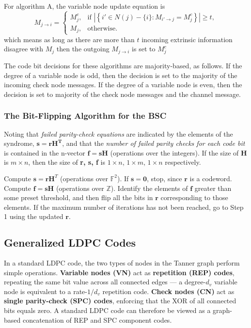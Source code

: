 \documentclass[11pt]{article}
\begin{document}
For algorithm A, the variable node update equation is
\[
M_{j \to i}
=
\begin{cases}
M_j^c, & \text{if } \left|\left\{ i' \in N(j)-\{i\} : M_{i' \to j} = M_j^c \right\}\right| \geq t,\\
M_j, & \text{otherwise.}
\end{cases}
\]
which means as long as there are more than $t$ incoming extrinsic information disagree with $M_j$ then the outgoing $M_{j \to i}$ is set to $M_j^c$

The code bit decisions for these algorithms are majority-based, as follows. If the degree of a variable node is odd, then the decision is set to the majority of the incoming check node messages. If the degree of a variable node is even, then the decision is set to majority of the check node messages and the channel message.

\subsubsection{The Bit-Flipping Algorithm for the BSC}
Noting that \textit{failed parity-check equations} are indicated by the elements of the syndrome, $\mathbf{s = r H^T}$, and that the \textit{number of failed parity checks for each code bit} is contained in the n-vector $\mathbf{f= sH}$ (operations over the integers). If the size of \textbf{H} is $m \times n$, then the size of \textbf{r, s, f} is $ 1 \times n$, $1 \times m$, $1 \times n$ respectively.

\begin{algorithm}[H]
\caption{The Bit-Flipping Algorithm}
\begin{algorithmic}[1]
\State Compute $\mathbf{s} = \mathbf{r}\mathbf{H}^{T}$ (operations over $\mathbb{F}^2$). If $\mathbf{s} = \mathbf{0}$, stop, since $\mathbf{r}$ is a codeword.
\State Compute $\mathbf{f} = \mathbf{s}\mathbf{H}$ (operations over $\mathbb{Z}$).
\State Identify the elements of $\mathbf{f}$ greater than some preset threshold, and then flip all the bits in $\mathbf{r}$ corresponding to those elements.
\State If the maximum number of iterations has not been reached, go to Step 1 using the updated $\mathbf{r}$.
\end{algorithmic}
\end{algorithm}


\clearpage
\subsection{Generalized LDPC Codes}
In a standard LDPC code, the two types of nodes in the Tanner graph perform 
simple operations. \textbf{Variable nodes (VN)} act as \textbf{repetition (REP) 
codes}, repeating the same bit value across all connected edges --- a degree-$d_v$ 
variable node is equivalent to a rate-$1/d_v$ repetition code. \textbf{Check nodes 
(CN)} act as \textbf{single parity-check (SPC) codes}, enforcing that the XOR of 
all connected bits equals zero. A standard LDPC code can therefore be viewed as a 
graph-based concatenation of REP and SPC component codes.
\end{document}
